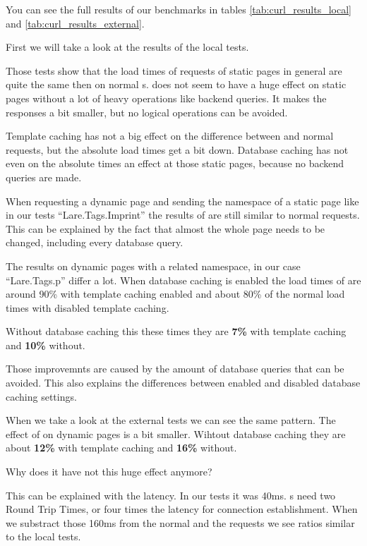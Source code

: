 You can see the full results of our benchmarks in tables \ref{tab:curl_results_local} and \ref{tab:curl_results_external}.

First we will take a look at the results of the local tests.

Those tests show that the load times of \lare{} requests of static pages in general are quite the same then on normal \httpRequest{}s.
\lare{} does not seem to have a huge effect on static pages without a lot of heavy operations like backend queries. It makes the responses a bit smaller, but no logical operations can be avoided.

Template caching has not a big effect on the difference between \lare{} and normal requests, but the absolute load times get a bit down.
Database caching has not even on the absolute times an effect at those static pages, because no backend queries are made.

When requesting a dynamic page and sending the namespace of a static page like in our tests \enquote{Lare.Tags.Imprint} the results of \lare{} are still similar to normal requests.
This can be explained by the fact that almost the whole page needs to be changed, including every database query.

The results on dynamic pages with a related namespace, in our case \enquote{Lare.Tags.p} differ a lot.
When database caching is enabled the load times of \lare{} are around 90\% with template caching enabled and about 80\% of the normal load times with disabled template caching.

Without database caching this these times they are \textbf{7\%} with template caching and \textbf{10\%} without.

Those improvemnts are caused by the amount of database queries that can be avoided. This also explains the differences between enabled and disabled database caching settings.

When we take a look at the external tests we can see the same pattern.
The effect of \lare{} on dynamic pages is a bit smaller.
Wihtout database caching they are about \textbf{12\%} with template caching and \textbf{16\%} without.

Why does it have not this huge effect anymore?

This can be explained with the latency.
In our tests it was 40ms.
\httpRequest{}s need two Round Trip Times, or four times the latency for connection establishment.
When we substract those 160ms from the normal and the \lare{} requests we see ratios similar to the local tests.


